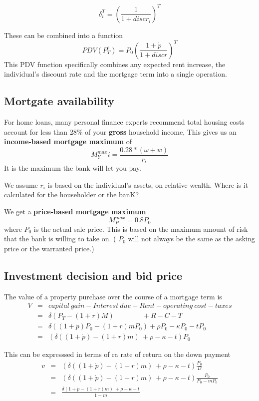 \[\delta_i^T= \left( \frac{1}{1+discr_i} \right)^T \]
 
These can be combined into a function %
\[ PDV(P^e_T)=P_0\left( \frac{1+\dot p}{1+discr} \right)^T \]
This PDV function specifically combines any expected rent increase, the individual's discount rate and the mortgage term into a single operation. 




\subsection{Mortgate availability}

For home loans, many personal finance experts recommend total housing costs account for less than 28\% of your \textbf{gross} household income, This gives us an \textbf{income-based  mortgage maximum} of \[M^{max}_Yi = \frac{0.28*(\omega+w)}{r_i}\] It is the maximum the bank will let you pay.

We assume $r_i$ is based on the individual's assets, on relative wealth. Where is it calculated for the householder or the banK?

We get a \textbf{price-based mortgage maximum} \[M^{max}_P = 0.8P_0\] where $P_0$ is the actual sale price. This is based on the maximum amount of risk that the bank is willing to take on. ( $P_0$  will not always be the same as the asking price or the warranted price.) 

\subsection{Investment decision and bid price}
The value of a property purchase over the course of a mortgage term is
\begin{eqnarray}
V  	&=& capital\ gain - Interest\ due  	+ Rent  - operating\ cost -taxes\\
&=& \delta(P_T- (1+r)M) \qquad \qquad 	 + R  	-C   - T\label{B2}\\
&=& \delta((1+\dot p)  P_0- (1+r)mP_0)   + \rho P_0  	-\kappa P_0 - tP_0\\
&=&( \delta((1+\dot p)  - (1+r)m) \ + \rho   	-\kappa -t) P_0
\end{eqnarray}

This can be expresssed in terms of ra rate of return on the down payment
\begin{eqnarray}
v&=&( \delta((1+\dot p)  - (1+r)m) \ + \rho   	-\kappa - t ) \frac{P_0}{D}   \nonumber\\
		&=&( \delta((1+\dot p)  - (1+r)m) \ + \rho   	-\kappa - t ) \frac{P_0}{P_0-mP_0}   \nonumber\\
		&=&\frac{ \delta(1+\dot p  - (1+r)m) \ + \rho   	-\kappa - t } {1-m} \label{Eqn:DecisionRule}
\end{eqnarray}

